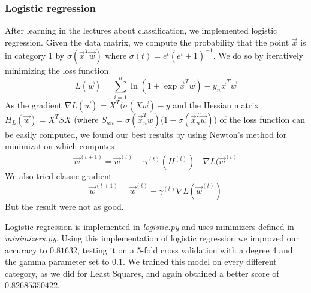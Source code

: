 \documentclass[10pt,conference,compsocconf]{IEEEtran}
\begin{document}
\subsubsection{Logistic regression} After learning in the lectures about classification, we implemented logistic regression. Given the data matrix, we compute the probability that the point $\vec{x}$ is in category 1 by $\sigma(\vec{x}^T\vec{w})$ where $\sigma(t) = e^t (e^t + 1)^{-1}$. We do so by iteratively minimizing the loss function
$$L(\vec{w}) = \sum^n_{i=1} \ln(1 + \exp{\vec{x}^T \vec{w}}) - y_n \vec{x}^T\vec{w}$$
As the gradient $\nabla L(\vec{w}) = X^T(\sigma(X\vec{w}) - y$ and the Hessian matrix $H_{L}(\vec{w}) = X^TSX$  (where $S_{nn} = \sigma(\vec{x}_n^T w)(1 - \sigma(\vec{x}_n^T\vec{w})$) of the loss function can be easily computed, we found our best results by using Newton's method for minimization which computes $$\vec{w}^{(t+1)} = \vec{w}^{(t)} - \gamma^{(t)} (H^{(t)})^{-1}\nabla L(\vec{w}^{(t)}$$ We also tried classic gradient $$\vec{w}^{(t+1)} = \vec{w}^{(t)} - \gamma^{(t)} \nabla L(\vec{w}^{(t)})$$ But the result were not as good.

Logistic regression is implemented in \textit{logistic.py} and uses minimizers defined in \textit{minimizers.py}. Using this implementation of logistic regression we improved our accuracy to $0.81632$, testing it on a 5-fold cross validation with a degree 4 and the gamma parameter set to $0.1$. We trained this model on every different category, as we did for Least Squares, and again obtained a better score of $0.82685350422$.
\end{document}
